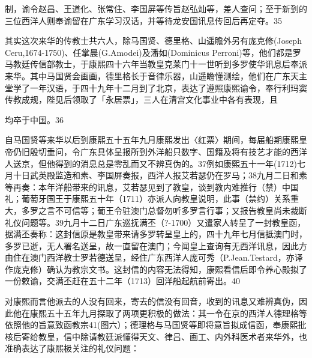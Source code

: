 \noindent 制，谕令赵昌、王道化、张常住、李国屏等传旨赵弘灿等，差人查问；至于新到的三位西洋人则奉谕留在广东学习汉话，并等待龙安国讯息传回后再定夺。35

其实这次来华的传教士共六人，除马国贤、德里格、山遥瞻外另有庞克修(Joseph Ceru,1674-1750)、任掌晨(G.Amodei)及潘如(Dominicus Perroni)等，他们都是罗马教廷传信部教士，于康熙四十六年当教皇克莱门十一世听到多罗使华讯息后奉派来华。其中马国贤会画画，德里格长于音律乐器，山遥瞻懂测绘，他们在广东天主堂学了一年汉语，于四十九年十二月到了北京，表达了遵照康熙谕令，奉行利玛窦传教成规，陛见后领取了「永居票」，三人在清宫文化事业中各有表现，且

\vfill
\begin{BookNotes}
\end{BookNotes}


\noindent 均卒于中国。36

自马国贤等来华以后到康熙五十五年九月康熙发出〈红票〉期间，每届船期康熙皇帝仍旧殷切垂问，令广东具体呈报所到外洋船只数字、国籍及将有技艺才能的西洋人送京，但他得到的消息总是零乱而又不辨真伪的。37例如康熙五十一年(1712)七月十日武英殿监造和素、李国屏奏报，西洋人报艾若瑟仍在罗马；38九月二日和素等再奏：本年洋船带来的讯息，艾若瑟见到了教皇，谈到教内难推行（禁）中国礼；葡萄牙国王于康熙五十年（1711）亦派人向教皇说明，此事（禁约）关系重大，多罗之言不可信等；葡王令驻澳门总督勿听多罗言行事；又报告教皇尚未裁断礼仪问题等。39九月十二日广东巡抚满丕（?-1700）又遣家人转呈了一封教皇函，据满丕奏称：这封信原是教皇带来请多罗转呈皇上的，四十九年七月信抵澳门时，多罗已逝，无人署名送呈，故一直留在澳门；今闻皇上查询有无西洋讯息，因此方由住在澳门西洋教士罗若德送呈，经住广东西洋人庞可秀（P.Jean.Testard，亦译作庞克修）确认为教宗文书。这封信的内容无法得知，康熙看信后即令养心殿拟了一份敕谕，交满丕赶在五十二年（1713）回洋船起航前寄出。40

对康熙而言他派去的人没有回来，寄去的信没有回音，收到的讯息又难辨真伪，因此他在康熙五十五年九月探取了两项更积极的做法：其一令在京的西洋人德理格等依照他的旨意致函教宗41(图六）；德理格与马国贤等即将意旨拟成信函，奉康熙批核后寄给教皇，信中除请教廷派懂得天文、律吕、画工、内外科医术者来华外，也准确表达了康熙极关注的礼仪问题：

